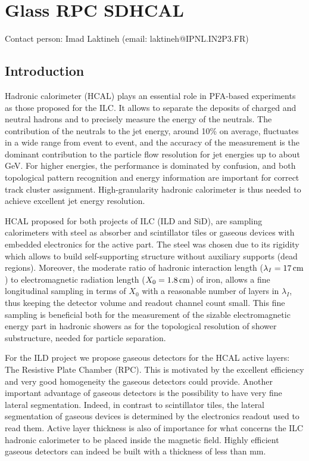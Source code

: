 \section{Glass RPC SDHCAL}
Contact person: Imad Laktineh (email: laktineh@IPNL.IN2P3.FR)
\subsection{Introduction}

Hadronic calorimeter (HCAL) plays an essential role in PFA-based experiments as
those proposed for the ILC. It allows to separate the deposits of charged and
neutral hadrons and to precisely measure the energy of the neutrals. The
contribution of the neutrals to the jet energy, around 10\% on average,
fluctuates in a wide range from event to event, and the accuracy of the
measurement is the dominant contribution to the particle flow resolution for jet
energies up to about \unit[100]{GeV}. For higher energies, the performance is
dominated by confusion, and both topological pattern recognition and energy
information are important for correct track cluster assignment.
High-granularity hadronic calorimeter is thus needed to achieve excellent jet
energy resolution.

HCAL proposed for both projects of ILC (ILD and SiD), are sampling calorimeters
with steel as absorber and scintillator tiles or gaseous devices with embedded
electronics for the active part. The steel was chosen due to its rigidity which
allows to build self-supporting structure without auxiliary supports (dead
regions). Moreover, the moderate ratio of hadronic interaction length
($\lambda_I = \unit[17]{cm}$) to electromagnetic radiation length ($X_0 = \unit[1.8]{cm}$) of
iron, allows a fine longitudinal sampling in terms of $X_0$ with a reasonable
number of layers in $\lambda_I$, thus keeping the detector volume and readout
channel count small. This fine sampling is beneficial both for the measurement
of the sizable electromagnetic energy part in hadronic showers as for the
topological resolution of shower substructure, needed for particle separation.

For the ILD project we propose gaseous detectors for the HCAL active layers: The
Resistive Plate Chamber (RPC). This is motivated by the excellent efficiency
and very good homogeneity the gaseous detectors could provide. Another
important advantage of gaseous detectors is the possibility to have very fine
lateral segmentation. Indeed, in contrast to scintillator tiles, the lateral
segmentation of gaseous devices is determined by the electronics readout used to
read them. Active layer thickness is also of importance for what concerns the
ILC hadronic calorimeter to be placed inside the magnetic field. Highly
efficient gaseous detectors can indeed be built with a thickness of less than
\unit[3]{mm}.


